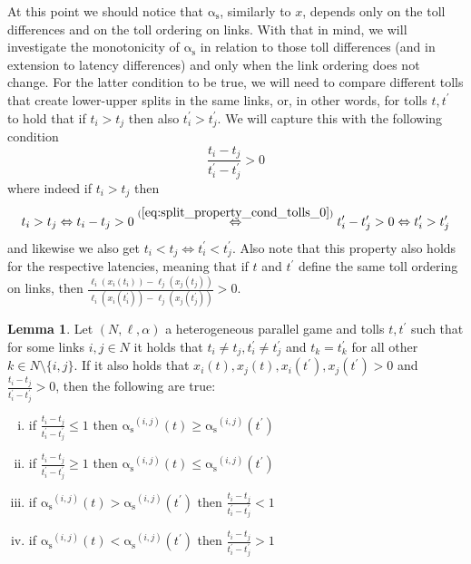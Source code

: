 \documentclass[10pt,a4paper]{book}
\newcommand{\LeftrightarrowArg}[1]{\stackrel{#1}{\Leftrightarrow}}
\newcommand{\as}{\mathrm{\alpha_s}}
\theoremstyle{definition}
\newtheorem{lemma}[definition]{Lemma}
\theoremstyle{comment}
\begin{document}
At this point we should notice that $\as$, similarly to $x$, depends only on the toll differences and on the toll ordering on links.
With that in mind, we will investigate the monotonicity of $\as$ in relation to those toll differences (and in extension to latency differences) and only when the link ordering does not change.
For the latter condition to be true, we will need to compare different tolls that create lower-upper splits in the same links, or, in other words, for tolls $t, t^\prime$ to hold that if $t_i > t_j$ then also $t_i^\prime > t_j^\prime$.
We will capture this with the following condition
\begin{equation}
	\label{eq:split_property_cond_tolls_0}
	\frac{t_i - t_j}{t_i^\prime - t_j^\prime} > 0
\end{equation}
where indeed if $t_i > t_j$ then
\[t_i > t_j \Leftrightarrow t_i - t_j > 0 \LeftrightarrowArg{(\ref{eq:split_property_cond_tolls_0})} t_i^\prime - t_j^\prime > 0 \Leftrightarrow t_i^\prime > t_j^\prime\]
and likewise we also get $t_i < t_j \Leftrightarrow t_i^\prime < t_j^\prime$.
Also note that this property also holds for the respective latencies, meaning that if $t$ and $t^\prime$ define the same toll ordering on links, then $\frac{\ell_i(x_i(t_i)) - \ell_j(x_j(t_j))}{\ell_i(x_i(t_i^\prime)) - \ell_j(x_j(t_j^\prime))} > 0$.

\begin{lemma}
	\label{lemma:split_monotonicity}
	Let $(N, \ell, \alpha)$ a heterogeneous parallel game and tolls $t, t^\prime$ such that for some links $i, j \in N$ it holds that $t_i \ne t_j, t_i^\prime \ne t_j^\prime$ and $t_k = t_k^\prime$ for all other $k \in N \setminus \{i, j\}$.
	If it also holds that $x_i(t), x_j(t), x_i(t^\prime), x_j(t^\prime) > 0$ and $\frac{t_i - t_j}{t_i^\prime - t_j^\prime} > 0$, then the following are true:
	\begin{enumerate}[(i)]
		\item if $\frac{t_i - t_j}{t_i^\prime - t_j^\prime} \le 1$ then $\as^{(i, j)}(t) \ge \as^{(i, j)}(t^\prime)$
		\item if $\frac{t_i - t_j}{t_i^\prime - t_j^\prime} \ge 1$ then $\as^{(i, j)}(t) \le \as^{(i, j)}(t^\prime)$
		\item if $\as^{(i, j)}(t) > \as^{(i, j)}(t^\prime)$ then $\frac{t_i - t_j}{t_i^\prime - t_j^\prime} < 1$
		\item if $\as^{(i, j)}(t) < \as^{(i, j)}(t^\prime)$ then $\frac{t_i - t_j}{t_i^\prime - t_j^\prime} > 1$
	\end{enumerate}
\end{lemma}
\end{document}
